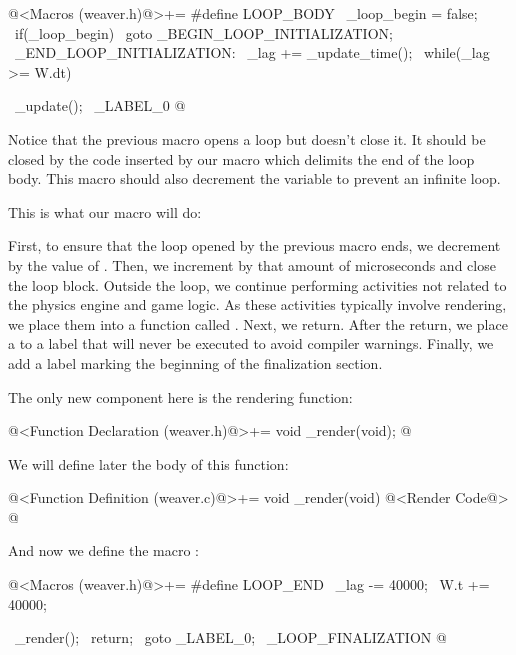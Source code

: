 \iniciocodigo
@<Macros (weaver.h)@>+=
#define LOOP_BODY                                            \
  _loop_begin =  false;                                      \
  if(_loop_begin)                                            \
    goto _BEGIN_LOOP_INITIALIZATION;                         \
_END_LOOP_INITIALIZATION:                                    \
  _lag += _update_time();                                    \
  while(_lag >= W.dt){                                       \
    _update();                                               \
_LABEL_0
@
\fimcodigo

Notice that the previous macro opens a \monoespaco{while} loop but
doesn’t close it. It should be closed by the code inserted by our
macro which delimits the end of the loop body. This macro should also
decrement the variable \monoespaco{\_lag} to prevent an infinite loop.


This is what our macro  will do:

First, to ensure that the loop opened by the previous macro ends, we
decrement \monoespaco{\_lag} by the value of \monoespaco{W.dt}. Then,
we increment \monoespaco{W.t} by that amount of microseconds and close
the loop block. Outside the loop, we continue performing activities
not related to the physics engine and game logic. As these activities
typically involve rendering, we place them into a function
called \monoespaco{\_render}. Next, we return. After the return, we
place a  to a label that will never be executed to
avoid compiler warnings. Finally, we add a label marking the beginning
of the finalization section.

The only new component here is the rendering function:

\iniciocodigo
@<Function Declaration (weaver.h)@>+=
void _render(void);
@
\fimcodigo

We will define later the body of this function:

\iniciocodigo
@<Function Definition (weaver.c)@>+=
void _render(void){
  @<Render Code@>
}
@
\fimcodigo

And now we define the macro :

\iniciocodigo
@<Macros (weaver.h)@>+=
#define LOOP_END                                           \
    _lag -=  40000;                                        \
    W.t +=  40000;                                         \
  }                                                        \
  _render();                                               \
  return;                                                  \
  goto _LABEL_0;                                           \
_LOOP_FINALIZATION
@
\fimcodigo

